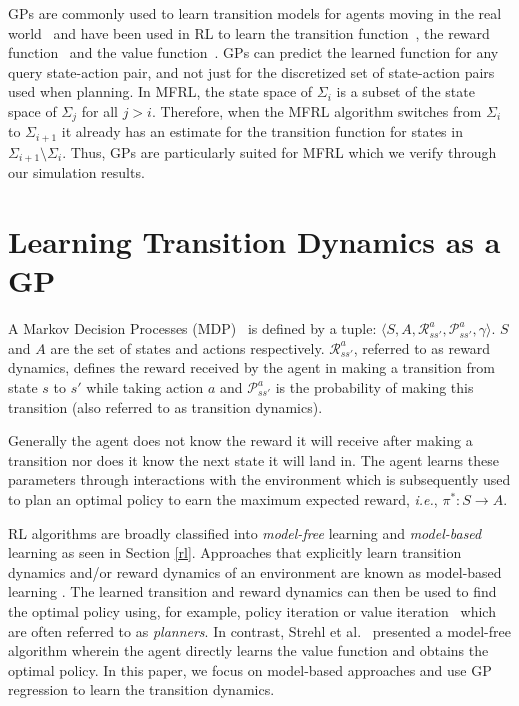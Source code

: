 \documentclass[12pt]{report}
\newcommand{\ie}{\textit{i.e.}}
\begin{document}
GPs are commonly used to learn transition models for agents moving in the real world~\cite{Dames2015} and have been used in RL to learn the transition function~\cite{rasmussen2003gaussian}, the reward function~\cite{deisenroth2010efficient} and the value function~\cite{engel2005reinforcement}. GPs can predict the learned function for any query state-action pair, and not just for the discretized set of state-action pairs used when planning. In MFRL, the state space of $\Sigma_i$ is a subset of the state space of $\Sigma_j$ for all $j>i$. Therefore, when the MFRL algorithm switches from $\Sigma_i$ to $\Sigma_{i+1}$ it already has an estimate for the transition function for states in $\Sigma_{i+1}\setminus\Sigma_{i}$. Thus, GPs are particularly suited for MFRL which we verify through our simulation results.


\section{Learning Transition Dynamics as a GP}
A Markov Decision Processes (MDP)~\cite{puterman2014markov} is defined by a tuple: $\langle S,A,\mathcal{R}_{ss'}^a,\mathcal{P}_{ss'}^a,\gamma\rangle$. $S$ and $A$ are the set of states and actions respectively. $\mathcal{R}_{ss'}^a$, referred to as reward dynamics, defines the reward received by the agent in making a transition from state $s$ to $s'$ while taking action $a$ and $\mathcal{P}_{ss'}^a$ is the probability of making this transition (also referred to as transition dynamics). 

Generally the agent does not know the reward it will receive after making a transition nor does it know the next state it will land in. The agent learns these parameters through interactions with the environment which is subsequently used to plan an optimal policy to earn the maximum expected reward, \ie, $\pi^{*}:S \rightarrow A$.

RL algorithms are broadly classified into \emph{model-free} learning and \emph{model-based} learning as seen in Section \ref{rl}. Approaches that explicitly learn transition dynamics and/or reward dynamics of an environment are known as model-based learning \cite{brafman2002r,kearns2002near}. The learned transition and reward dynamics can then be used to find the optimal policy using, for example, policy iteration or value iteration~\cite{sutton1998reinforcement} which are often referred to as \emph{planners}. In contrast, Strehl et al.~\cite{strehl2006pac} presented a model-free algorithm wherein the agent directly learns the value function and obtains the optimal policy. In this paper, we focus on model-based approaches and use GP regression to learn the transition dynamics. 
\end{document}
